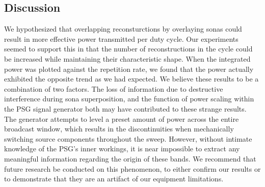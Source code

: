 \subsection{Discussion}
\label{sec:overlapping-discussion}

We hypothesized that overlapping reconsturctions by overlaying sonas could result in more effective power transmitted per duty cycle. Our experiments seemed to support this in that the number of reconstructions in the cycle could be increased while maintaining their characteristic shape. When the integrated power was plotted against the repetition rate, we found that the power actually exhibited the opposite trend as we had expected. We believe these results to be a combination of two factors. The loss of information due to destructive interference during sona superposition, and the function of power scaling within the PSG signal generator both may have contributed to these strange results. The generator attempts to level a preset amount of power across the entire broadcast window, which results in the discontinuities when mechanically switching source components throughout the sweep. However, without intimate knowledge of the PSG's inner workings, it is near impossible to extract any meaningful information regarding the origin of these bands. We recommend that future research be conducted on this phenomenon, to either confirm our results or to demonstrate that they are an artifact of our equipment limitations.

